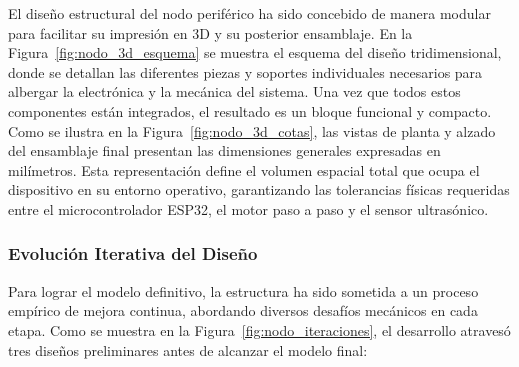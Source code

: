 El diseño estructural del nodo periférico ha sido concebido de manera modular para facilitar su impresión en 3D y su posterior ensamblaje. En la Figura~\ref{fig:nodo_3d_esquema} se muestra el esquema del diseño tridimensional, donde se detallan las diferentes piezas y soportes individuales necesarios para albergar la electrónica y la mecánica del sistema. Una vez que todos estos componentes están integrados, el resultado es un bloque funcional y compacto. Como se ilustra en la Figura~\ref{fig:nodo_3d_cotas}, las vistas de planta y alzado del ensamblaje final presentan las dimensiones generales expresadas en milímetros. Esta representación define el volumen espacial total que ocupa el dispositivo en su entorno operativo, garantizando las tolerancias físicas requeridas entre el microcontrolador ESP32, el motor paso a paso y el sensor ultrasónico.



\subsubsection*{Evolución Iterativa del Diseño}

Para lograr el modelo definitivo, la estructura ha sido sometida a un proceso empírico de mejora continua, abordando diversos desafíos mecánicos en cada etapa. Como se muestra en la Figura~\ref{fig:nodo_iteraciones}, el desarrollo atravesó tres diseños preliminares antes de alcanzar el modelo final:

